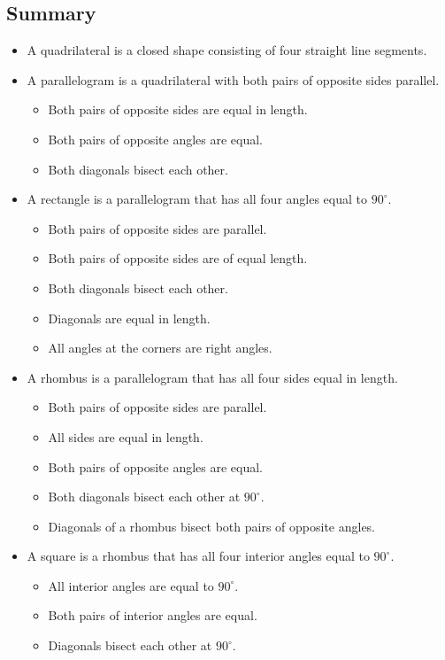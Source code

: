 \subsection{ Summary}
\begin{itemize}[noitemsep]
\item A quadrilateral is a closed shape consisting of four straight line segments.
\item A parallelogram is a quadrilateral with both pairs of opposite sides parallel.
\begin{itemize}
\item Both pairs of opposite sides are equal in length.
\item Both pairs of opposite angles are equal.
\item Both diagonals bisect each other.
\end{itemize}
\item A rectangle is a parallelogram that has all four angles equal to $90^\circ$.
\begin{itemize}
\item  Both pairs of opposite sides are parallel.
\item Both pairs of opposite sides are of equal length.
\item Both diagonals bisect each other.
\item Diagonals are equal in length.
\item All angles at the corners are right angles.
\end{itemize}
\item A rhombus is a parallelogram that has all four sides equal in length.
\begin{itemize}
\item Both pairs of opposite sides are parallel.
\item All sides are equal in length.
\item Both pairs of opposite angles are equal.
\item Both diagonals bisect each other at $90^\circ$.
\item Diagonals of a rhombus bisect both pairs of opposite angles.
\end{itemize}
\item A square is a rhombus that has all four interior angles equal to $90^\circ$.
\begin{itemize}
\item All interior angles are equal to $90^\circ$.
\item Both pairs of interior angles are equal.
\item Diagonals bisect each other at $90^\circ$.

\end{itemize}
\end{itemize}
